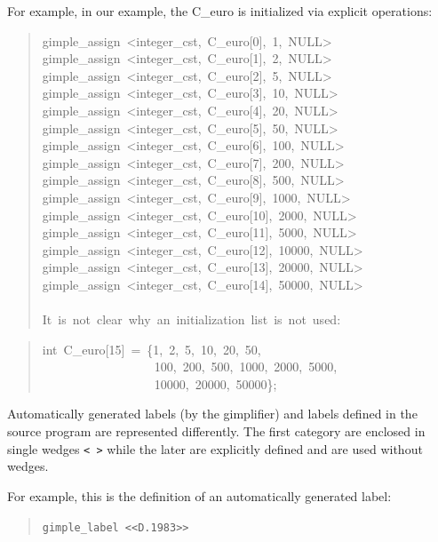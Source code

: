 \documentclass[a4paper]{article}
\begin{document}
For example, in our example, the C\_euro is initialized via explicit
operations:
%
\begin{quote}{\ttfamily \raggedright \noindent
gimple\_assign~<integer\_cst,~C\_euro{[}0{]},~1,~NULL>\\
gimple\_assign~<integer\_cst,~C\_euro{[}1{]},~2,~NULL>\\
gimple\_assign~<integer\_cst,~C\_euro{[}2{]},~5,~NULL>\\
gimple\_assign~<integer\_cst,~C\_euro{[}3{]},~10,~NULL>\\
gimple\_assign~<integer\_cst,~C\_euro{[}4{]},~20,~NULL>\\
gimple\_assign~<integer\_cst,~C\_euro{[}5{]},~50,~NULL>\\
gimple\_assign~<integer\_cst,~C\_euro{[}6{]},~100,~NULL>\\
gimple\_assign~<integer\_cst,~C\_euro{[}7{]},~200,~NULL>\\
gimple\_assign~<integer\_cst,~C\_euro{[}8{]},~500,~NULL>\\
gimple\_assign~<integer\_cst,~C\_euro{[}9{]},~1000,~NULL>\\
gimple\_assign~<integer\_cst,~C\_euro{[}10{]},~2000,~NULL>\\
gimple\_assign~<integer\_cst,~C\_euro{[}11{]},~5000,~NULL>\\
gimple\_assign~<integer\_cst,~C\_euro{[}12{]},~10000,~NULL>\\
gimple\_assign~<integer\_cst,~C\_euro{[}13{]},~20000,~NULL>\\
gimple\_assign~<integer\_cst,~C\_euro{[}14{]},~50000,~NULL>\\
~\\
It~is~not~clear~why~an~initialization~list~is~not~used:
}
\end{quote}
%
\begin{quote}{\ttfamily \raggedright \noindent
int~C\_euro{[}15{]}~=~\{1,~2,~5,~10,~20,~50,\\
~~~~~~~~~~~~~~~~~~100,~200,~500,~1000,~2000,~5000,\\
~~~~~~~~~~~~~~~~~~10000,~20000,~50000\};
}
\end{quote}

Automatically generated labels (by the gimplifier) and labels defined in the
source program are represented differently. The first category are enclosed
in single wedges \texttt{< >} while the later are explicitly defined and are
used without wedges.

For example, this is the definition of an automatically generated label:
%
\begin{quote}

\texttt{gimple\_label <{}<D.1983>{}>}

\end{quote}
\end{document}
